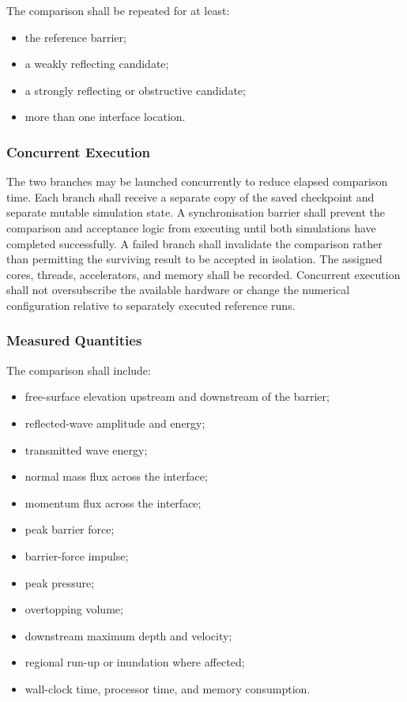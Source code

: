 The comparison shall be repeated for at least:

\begin{itemize}
  \item the reference barrier;
  \item a weakly reflecting candidate;
  \item a strongly reflecting or obstructive candidate;
  \item more than one interface location.
\end{itemize}

\subsubsection{Concurrent Execution}
\label{sec:res-ver-tst-coupling-mode-concurrency}

The two branches may be launched concurrently to reduce elapsed
comparison time. Each branch shall receive a separate copy of the saved
checkpoint and separate mutable simulation state. A synchronisation
barrier shall prevent the comparison and acceptance logic from
executing until both simulations have completed successfully. A failed
branch shall invalidate the comparison rather than permitting the
surviving result to be accepted in isolation. The assigned cores,
threads, accelerators, and memory shall be recorded. Concurrent
execution shall not oversubscribe the available hardware or change the
numerical configuration relative to separately executed reference runs.

\subsubsection{Measured Quantities}
\label{sec:res-ver-tst-coupling-mode-quantities}

The comparison shall include:

\begin{itemize}
  \item free-surface elevation upstream and downstream of the barrier;
  \item reflected-wave amplitude and energy;
  \item transmitted wave energy;
  \item normal mass flux across the interface;
  \item momentum flux across the interface;
  \item peak barrier force;
  \item barrier-force impulse;
  \item peak pressure;
  \item overtopping volume;
  \item downstream maximum depth and velocity;
  \item regional run-up or inundation where affected;
  \item wall-clock time, processor time, and memory consumption.
\end{itemize}

